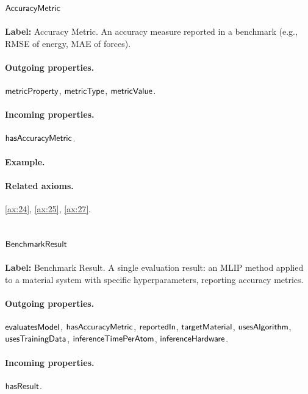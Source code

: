 \subsection{$\mathsf{AccuracyMetric}$}
\label{sec:term-AccuracyMetric}

\textbf{Label:} Accuracy Metric.
An accuracy measure reported in a benchmark (e.g., RMSE of energy, MAE of forces).

\paragraph{Outgoing properties.} $\mathsf{metricProperty}$, $\mathsf{metricType}$, $\mathsf{metricValue}$.

\paragraph{Incoming properties.} $\mathsf{hasAccuracyMetric}$.

\paragraph{Example.}

\paragraph{Related axioms.} \eqref{ax:24}, \eqref{ax:25}, \eqref{ax:27}.

\subsection{$\mathsf{BenchmarkResult}$}
\label{sec:term-BenchmarkResult}

\textbf{Label:} Benchmark Result.
A single evaluation result: an MLIP method applied to a material system with specific hyperparameters, reporting accuracy metrics.

\paragraph{Outgoing properties.} $\mathsf{evaluatesModel}$, $\mathsf{hasAccuracyMetric}$, $\mathsf{reportedIn}$, $\mathsf{targetMaterial}$, $\mathsf{usesAlgorithm}$, $\mathsf{usesTrainingData}$, $\mathsf{inferenceTimePerAtom}$, $\mathsf{inferenceHardware}$.

\paragraph{Incoming properties.} $\mathsf{hasResult}$.

